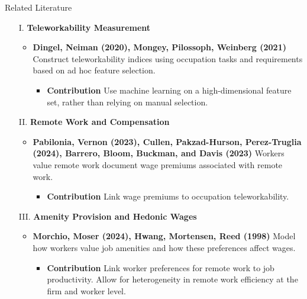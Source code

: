 \documentclass[aspectratio=1610]{beamer}
\begin{document}
\begin{frame}{Related Literature}
    \begin{itemize}
        \item[I.] \textbf{Teleworkability Measurement} 
        \begin{itemize}
            \item \textbf{Dingel, Neiman (2020), Mongey, Pilossoph, Weinberg (2021)} Construct teleworkability indices using occupation tasks and requirements based on ad hoc feature selection.
            \begin{itemize}
                \item \textbf{Contribution} Use machine learning on a high-dimensional feature set, rather than relying on manual selection.
            \end{itemize}
        \end{itemize}
        \vspace{0.3cm}
        
        \pause
        \item[II.] \textbf{Remote Work and Compensation}
        \begin{itemize}
            \item \textbf{Pabilonia, Vernon (2023), Cullen, Pakzad-Hurson, Perez-Truglia (2024), Barrero, Bloom, Buckman, and Davis (2023)} Workers value remote work document wage premiums associated with remote work.
            \begin{itemize}
                \item \textbf{Contribution} Link wage premiums to occupation teleworkability.
            \end{itemize}
        \end{itemize}
        \pause

        \vspace{0.3cm}
        \item[III.] \textbf{Amenity Provision and Hedonic Wages}
        \begin{itemize}
            \item \textbf{Morchio, Moser (2024), Hwang, Mortensen, Reed (1998)} Model how workers value job amenities and how these preferences affect wages. 
            \begin{itemize}
                \item \textbf{Contribution} Link worker preferences for remote work to job productivity. Allow for heterogeneity in remote work efficiency at the firm and worker level.
            \end{itemize}
        \end{itemize}
    \end{itemize}
\end{frame}
\end{document}
